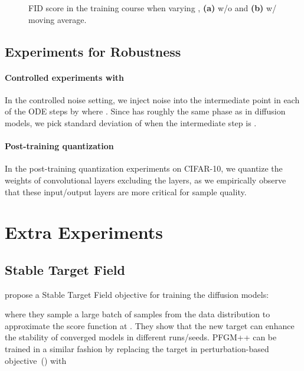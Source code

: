 \begin{figure*}
\centering
        \caption{FID score in the training course when varying , \textbf{(a)} w/o and \textbf{(b)} w/ moving average.}
\end{figure*}


\subsection{Experiments for Robustness}
\label{app:robust-exp}

\paragraph{Controlled experiments with } In the controlled noise setting, we inject noise into the intermediate point  in each of the  ODE steps by  where . Since  has roughly the same phase as  in diffusion models, we pick  standard deviation of  when the intermediate step is .

\paragraph{Post-training quantization} In the post-training quantization experiments on CIFAR-10, we quantize the weights of convolutional layers excluding the  layers, as we empirically observe that these input/output layers are more critical for sample quality.
\section{Extra Experiments}

\subsection{Stable Target Field}
\label{app:stf}

\citet{Xu2023StableTF} propose a Stable Target Field objective for training the diffusion models:

where they sample a large batch of samples  from the data distribution to approximate the score function at . They show that the new target can enhance the stability of converged models in different runs/seeds. PFGM++ can be trained in a similar fashion by replacing the target  in perturbation-based objective~() with

